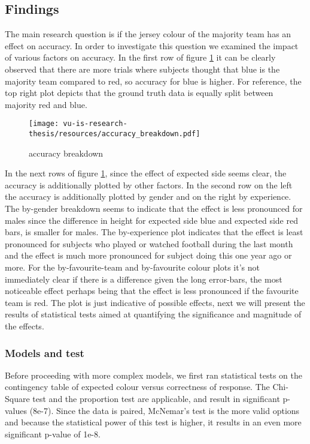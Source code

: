 \subsection{Findings}
The main research question is if the jersey colour of the majority team has an effect on accuracy. In order to investigate this question we examined the impact of various factors on accuracy. In the first row of figure \ref{stats2} it can be clearly observed that there are more trials where subjects thought that blue is the majority team compared to red, so accuracy for blue is higher. For reference, the top right plot depicts that the ground truth data is equally split between majority red and blue. 
\begin{figure}[h!]
    \hspace{-0.5cm} %
    \texttt{[image: vu-is-research-thesis/resources/accuracy\_breakdown.pdf]}
   \caption{accuracy breakdown}
   \label{stats2}
\end{figure}
In the next rows of figure \ref{stats2}, since the effect of expected side seems clear, the accuracy is additionally plotted by other factors. In the second row on the left the accuracy is additionally plotted by gender and on the right by experience. The by-gender breakdown seems to indicate that the effect is less pronounced for males since the difference in height for expected side blue and expected side red bars, is smaller for males. The by-experience plot indicates that the effect is least pronounced for subjects who played or watched football during the last month and the effect is much more pronounced for subject doing this one year ago or more. For the by-favourite-team and by-favourite colour plots it's not immediately clear if there is a difference given the long error-bars, the most noticeable effect perhaps being that the effect is less pronounced if the favourite team is red. The plot is just indicative of possible effects, next we will present the results of statistical tests aimed at quantifying the significance and magnitude of the effects.

\subsubsection{Models and test}

Before proceeding with more complex models, we first ran statistical tests on the contingency table of expected colour versus correctness of response. The Chi-Square test and the proportion test are applicable, and result in significant p-values (8e-7). Since the data is paired, McNemar's test is the more valid options and because the statistical power of this test is higher, it results in an even more significant p-value of 1e-8. 

